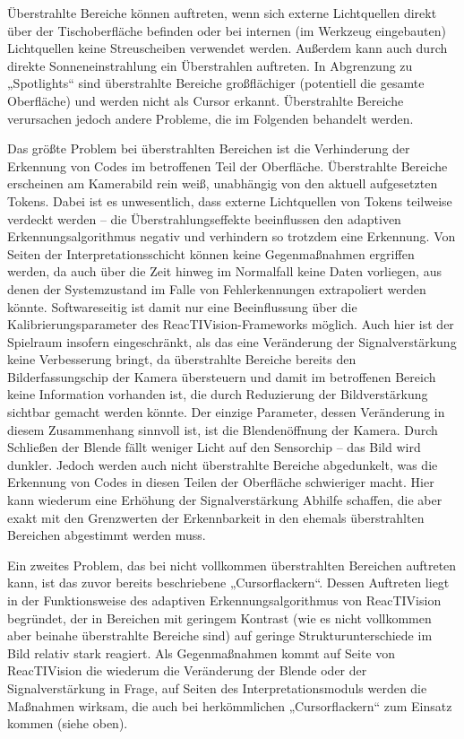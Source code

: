Überstrahlte Bereiche können auftreten, wenn sich externe Lichtquellen direkt über der Tischoberfläche befinden oder bei internen (im Werkzeug eingebauten) Lichtquellen keine Streuscheiben verwendet werden. Außerdem kann auch durch direkte Sonneneinstrahlung ein Überstrahlen auftreten. In Abgrenzung zu „Spotlights“ sind überstrahlte Bereiche großflächiger (potentiell die gesamte Oberfläche) und werden nicht als Cursor erkannt. Überstrahlte Bereiche verursachen jedoch andere Probleme, die im Folgenden behandelt werden.

Das größte Problem bei überstrahlten Bereichen ist die Verhinderung der Erkennung von Codes im betroffenen Teil der Oberfläche. Überstrahlte Bereiche erscheinen am Kamerabild rein weiß, unabhängig von den aktuell aufgesetzten Tokens. Dabei ist es unwesentlich, dass externe Lichtquellen von Tokens teilweise verdeckt werden -- die Überstrahlungseffekte beeinflussen den adaptiven Erkennungsalgorithmus negativ und verhindern so trotzdem eine Erkennung. Von Seiten der Interpretationsschicht können keine Gegenmaßnahmen ergriffen werden, da auch über die Zeit hinweg im Normalfall keine Daten vorliegen, aus denen der Systemzustand im Falle von Fehlerkennungen extrapoliert werden könnte. Softwareseitig ist damit nur eine Beeinflussung über die Kalibrierungsparameter des ReacTIVision-Frameworks möglich. Auch hier ist der Spielraum insofern eingeschränkt, als das eine Veränderung der Signalverstärkung keine Verbesserung bringt, da überstrahlte Bereiche bereits den Bilderfassungschip der Kamera übersteuern und damit im betroffenen Bereich keine Information vorhanden ist, die durch Reduzierung der Bildverstärkung sichtbar gemacht werden könnte. Der einzige Parameter, dessen Veränderung in diesem Zusammenhang sinnvoll ist, ist die Blendenöffnung der Kamera. Durch Schließen der Blende fällt weniger Licht auf den Sensorchip -- das Bild wird dunkler. Jedoch werden auch nicht überstrahlte Bereiche abgedunkelt, was die Erkennung von Codes in diesen Teilen der Oberfläche schwieriger macht. Hier kann wiederum eine Erhöhung der Signalverstärkung Abhilfe schaffen, die aber exakt mit den Grenzwerten der Erkennbarkeit in den ehemals überstrahlten Bereichen abgestimmt werden muss.

Ein zweites Problem, das bei nicht vollkommen überstrahlten Bereichen auftreten kann, ist das zuvor bereits beschriebene „Cursorflackern“. Dessen Auftreten liegt in der Funktionsweise des adaptiven Erkennungsalgorithmus von ReacTIVision begründet, der in Bereichen mit geringem Kontrast (wie es nicht vollkommen aber beinahe überstrahlte Bereiche sind) auf geringe Strukturunterschiede im Bild relativ stark reagiert. Als Gegenmaßnahmen kommt auf Seite von ReacTIVision die wiederum die Veränderung der Blende oder der Signalverstärkung in Frage, auf Seiten des Interpretationsmoduls werden die Maßnahmen wirksam, die auch bei herkömmlichen „Cursorflackern“ zum Einsatz kommen (siehe oben).

